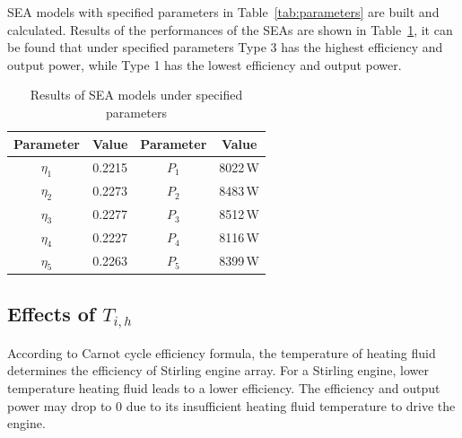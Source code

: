 SEA models with specified parameters in Table~\ref{tab:parameters} are built and calculated. Results of the performances of the SEAs are shown in Table~\ref{tab:result}, it can be found that under specified parameters Type 3 has the highest efficiency and output power, while Type 1 has the lowest efficiency and output power.

\begin{table}[htbp]
	\caption{Results of SEA models under specified parameters}
	\begin{center}
	\begin{tabular}{cccc}
		\toprule
		Parameter		&	Value	&	Parameter		&	Value\\
		\midrule
		$\eta_1$	&	0.2215	&	$P_1$		&	8022\,W\\
		$\eta_2$	&	0.2273	&	$P_2$		&	8483\,W\\
		$\eta_3$	&	0.2277	&	$P_3$		&	8512\,W\\
		$\eta_4$	&	0.2227	&	$P_4$		&	8116\,W\\
		$\eta_5$	&	0.2263	&	$P_5$		&	8399\,W\\		
		\bottomrule
	\end{tabular}
	\end{center}
	\label{tab:result}
\end{table}

\subsection{Effects of $T_{i,h}$}
According to Carnot cycle efficiency formula, the temperature of heating fluid determines the efficiency of Stirling engine array. For a Stirling engine, lower temperature heating fluid leads to a lower efficiency. The efficiency and output power may drop to 0 due to its insufficient heating fluid temperature to drive the engine.

